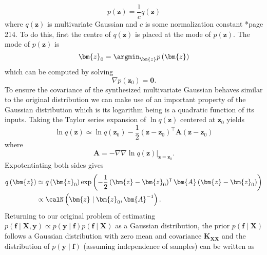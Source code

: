 \begin{equation*}
    p \left( \bm{z} \right) = \frac{1}{c} q \left( \bm{z} \right)
\end{equation*}
where $q \left( \bm{z} \right)$ is multivariate Gaussian and $c$ is some normalization constant \cite{BishopChristopherM2006Pram}*{page 214}. To do this, first the centre of $q \left( \bm{z} \right)$ is placed at the mode of $p \left( \bm{z} \right)$. The mode of $p \left( \bm{z} \right)$ is
\begin{equation*}
    \bm{z}_0 = \argmin_{\bm{z}} p \left( \bm{z} \right)
\end{equation*}
which can be computed by solving
\begin{equation} \label{eq: lapace-grad-zero}
    \nabla p \left( \bm{z}_0 \right) = \bm{0}.
\end{equation}
To ensure the covariance of the synthesized multivariate Gaussian behaves similar to the original distribution we can make use of an important property of the Gaussian distribution which is its logarithm being is a quadratic function of its inputs. Taking the Taylor series expansion of $\ln q \left( \bm{z} \right)$ centered at $\bm{z}_0$ yields
\begin{equation*}
    \ln q \left( \bm{z} \right) \simeq \ln q \left( \bm{z}_0 \right) - \frac{1}{2} \left( \bm{z} - \bm{z}_0 \right)^{\intercal} \bm{A} \left( \bm{z} - \bm{z}_0 \right)
\end{equation*}
where
\begin{equation*}
    \bm{A} = - \nabla \nabla \left. \ln q \left( \bm{z} \right) \right|_{\bm{z} = \bm{z}_0}.
\end{equation*}
Expotentiating both sides gives
\begin{align}
    q \left( \bm{z} \right)
     & \simeq q \left( \bm{z}_0 \right) \exp \left( - \frac{1}{2} \left( \bm{z} - \bm{z}_0 \right)^{\intercal} \bm{A} \left( \bm{z} - \bm{z}_0 \right) \right) \nonumber \\
     & \propto \calN \left( \bm{z} \mid \bm{z}_0 , \bm{A}^{-1} \right) \label{eq: lapace-gauss-apprx} .
\end{align}
Returning to our original problem of estimating $p \left( \bm{f} \mid \bm{X} , \bm{y} \right) \propto p \left( \bm{y} \mid \bm{f} \right) p \left( \bm{f} \mid \bm{X} \right)$ as a Gaussian distribution, the prior $p \left( \bm{f} \mid \bm{X} \right)$ follows a Gaussian distribution with zero mean and covariance $\bm{K}_{\bm{X} \bm{X}}$ and the distribution of $p \left( \bm{y} \mid \bm{f} \right)$ (assuming independence of samples) can be written as
